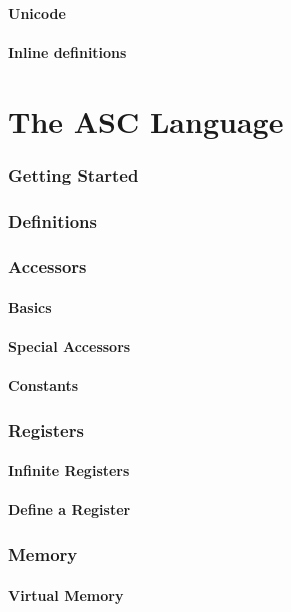 \documentclass{scrartcl}
\begin{document}
        \subsection{Unicode}
        \subsection{Inline definitions}
\part{The ASC Language}
    \section{Getting Started}
    \section{Definitions}
    \section{Accessors}
        \subsection{Basics}
        \subsection{Special Accessors}
        \subsection{Constants}
    \section{Registers}
        \subsection{Infinite Registers}
        \subsection{Define a Register}
    \section{Memory}
        \subsection{Virtual Memory}
\end{document}
